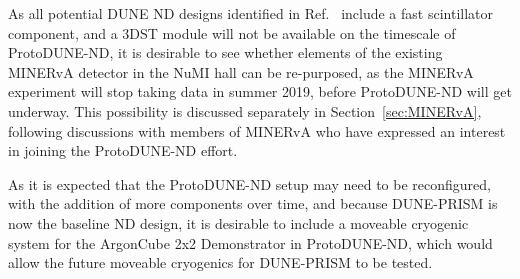 As all potential DUNE ND designs identified in Ref.~\cite{dune_ndcsg} include a fast scintillator component, and a 3DST module will not be available on the timescale of ProtoDUNE-ND, it is desirable to see whether elements of the existing MINERvA detector in the NuMI hall can be re-purposed, as the MINERvA experiment will stop taking data in summer 2019, before ProtoDUNE-ND will get underway. This possibility is discussed separately in Section~\ref{sec:MINERvA}, following discussions with members of MINERvA who have expressed an interest in joining the ProtoDUNE-ND effort.

As it is expected that the ProtoDUNE-ND setup may need to be reconfigured, with the addition of more components over time, and because DUNE-PRISM is now the baseline ND design, it is desirable to include a moveable cryogenic system for the ArgonCube 2x2 Demonstrator in ProtoDUNE-ND, which would allow the future moveable cryogenics for DUNE-PRISM to be tested.

